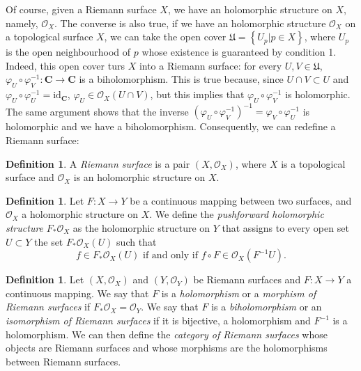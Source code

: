 \documentclass[12pt,a4paper]{book}
\theoremstyle{definition} \newtheorem{defn}[thm]{Definition}
\theoremstyle{definition} \newtheorem{ejemplo}[thm]{Example}
\theoremstyle{definition} \newtheorem{ejercicio}[thm]{Exercise}
\theoremstyle{remark} \newtheorem*{obs}{Remark}
\def\CC{\mathbf{C}}
\def\id{\mathrm{id}}
\def\OO{\mathscr{O}}
\begin{document}
Of course, given a Riemann surface $X$, we have an holomorphic structure on $X$, namely, $\OO_X$. The converse is also true, if we have an holomorphic structure $\OO_X$ on a topological surface $X$, we can take the open cover $\mathfrak{U}=\left\{ U_p |p\in X \right\}$, where $U_p$ is the open neighbourhood of $p$ whose existence is guaranteed by condition 1. Indeed, this open cover turs $X$ into a Riemann surface: for every $U,V \in \mathfrak{U}$, $\varphi_U \circ \varphi_V^{-1}:\CC \rightarrow \CC$ is a biholomorphism. This is true because, since $U\cap V \subset U$ and $\varphi_U \circ \varphi_U^{-1}=\id_\CC$, $\varphi_U \in \OO_X(U\cap V)$, but this implies that $\varphi_U \circ \varphi_V^{-1}$ is holomorphic. The same argument shows that the inverse $(\varphi_U \circ \varphi_V^{-1})^{-1}=\varphi_V \circ \varphi_U^{-1}$ is holomorphic and we have a biholomorphism. Consequently, we can redefine a Riemann surface:
\begin{defn}
  A \emph{Riemann surface} is a pair $(X,\OO_X)$, where $X$ is a topological surface and $\OO_X$ is an holomorphic structure on $X$.
\end{defn}

\begin{defn}
  Let $F:X\rightarrow Y$ be a continuous mapping between two surfaces, and $\OO_X$ a holomorphic structure on $X$. We define the \emph{pushforward holomorphic structure} $F_*\OO_X$ as the holomorphic structure on $Y$ that assigns to every open set $U\subset Y$ the set $F_*\OO_X(U)$ such that
  \begin{equation*}
    f \in F_*\OO_X(U) \text{ if and only if } f\circ F \in \OO_X(F^{-1}U).
  \end{equation*}
\end{defn}

\begin{defn}
  Let $(X,\OO_X)$ and $(Y,\OO_Y)$ be Riemann surfaces and $F:X\rightarrow Y$ a continuous mapping. We say that $F$ is a \emph{holomorphism} or a \emph{morphism of Riemann surfaces} if $F_*\OO_X = \OO_Y$. We say that $F$ is a \emph{biholomorphism} or an \emph{isomorphism of Riemann surfaces} if it is bijective, a holomorphism and $F^{-1}$ is a holomorphism. We can then define the \emph{category of Riemann surfaces} whose objects are Riemann surfaces and whose morphisms are the holomorphisms between Riemann surfaces.
\end{defn}
\end{document}
